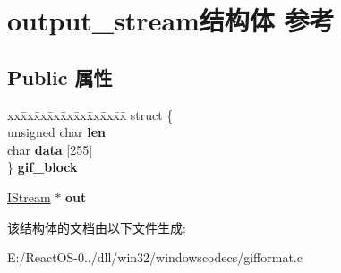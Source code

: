 \hypertarget{structoutput__stream}{}\section{output\+\_\+stream结构体 参考}
\label{structoutput__stream}
\subsection*{Public 属性}
\begin{DoxyCompactItemize}
\item 
\mbox{\label{structoutput__stream_af9a02aa52fe63836a6bcc011053b3d2a}} 
\begin{tabbing}
xx\=xx\=xx\=xx\=xx\=xx\=xx\=xx\=xx\=\kill
struct \{\\
\>unsigned char {\bfseries len}\\
\>char {\bfseries data} \mbox{[}255\mbox{]}\\
\} {\bfseries gif\_block}\\

\end{tabbing}\item 
\mbox{\label{structoutput__stream_af13af68168c54a9b0f31b547f63995cf}} 
\hyperlink{interface_i_stream}{I\+Stream} $\ast$ {\bfseries out}
\end{DoxyCompactItemize}


该结构体的文档由以下文件生成\+:\begin{DoxyCompactItemize}
\item 
E\+:/\+React\+O\+S-\/0../dll/win32/windowscodecs/gifformat.\+c\end{DoxyCompactItemize}
